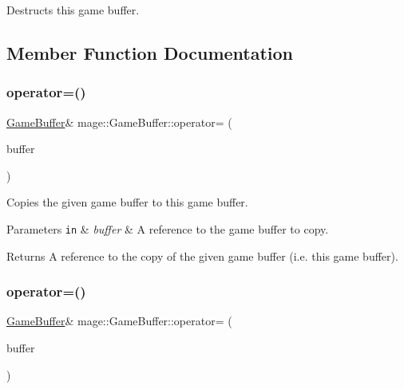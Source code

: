 Destructs this game buffer. 

\subsection{Member Function Documentation}
\hypertarget{structmage_1_1_game_buffer_aa21f68c930b1c180aaaeeee95854b021}{}\label{structmage_1_1_game_buffer_aa21f68c930b1c180aaaeeee95854b021} 
\subsubsection{\texorpdfstring{operator=()}{operator=()}\hspace{0.1cm}{\footnotesize\ttfamily [1/2]}}
{\footnotesize\ttfamily \hyperlink{structmage_1_1_game_buffer}{Game\+Buffer}\& mage\+::\+Game\+Buffer\+::operator= (\begin{DoxyParamCaption}\item[{const \hyperlink{structmage_1_1_game_buffer}{Game\+Buffer} \&}]{buffer }\end{DoxyParamCaption})\hspace{0.3cm}{\ttfamily [default]}}

Copies the given game buffer to this game buffer.


\begin{DoxyParams}[1]{Parameters}
\mbox{\tt in}  & {\em buffer} & A reference to the game buffer to copy. \\
\hline
\end{DoxyParams}
\begin{DoxyReturn}{Returns}
A reference to the copy of the given game buffer (i.\+e. this game buffer). 
\end{DoxyReturn}
\hypertarget{structmage_1_1_game_buffer_af699a10b932a9f766acb990edefa03a5}{}\label{structmage_1_1_game_buffer_af699a10b932a9f766acb990edefa03a5} 
\subsubsection{\texorpdfstring{operator=()}{operator=()}\hspace{0.1cm}{\footnotesize\ttfamily [2/2]}}
{\footnotesize\ttfamily \hyperlink{structmage_1_1_game_buffer}{Game\+Buffer}\& mage\+::\+Game\+Buffer\+::operator= (\begin{DoxyParamCaption}\item[{\hyperlink{structmage_1_1_game_buffer}{Game\+Buffer} \&\&}]{buffer }\end{DoxyParamCaption})\hspace{0.3cm}{\ttfamily [default]}}

